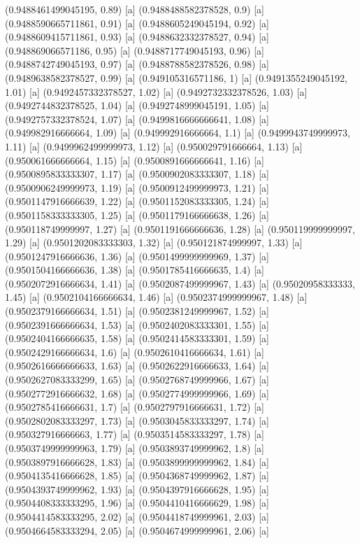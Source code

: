 {{{(0.9488461499045195, 0.89) [a] 
(0.9488488582378528, 0.9) [a] 
(0.9488590665711861, 0.91) [a] 
(0.9488605249045194, 0.92) [a] 
(0.9488609415711861, 0.93) [a] 
(0.9488632332378527, 0.94) [a] 
(0.948869066571186, 0.95) [a] 
(0.9488717749045193, 0.96) [a] 
(0.9488742749045193, 0.97) [a] 
(0.9488788582378526, 0.98) [a] 
(0.9489638582378527, 0.99) [a] 
(0.949105316571186, 1) [a] 
(0.9491355249045192, 1.01) [a] 
(0.9492457332378527, 1.02) [a] 
(0.9492732332378526, 1.03) [a] 
(0.9492744832378525, 1.04) [a] 
(0.9492748999045191, 1.05) [a] 
(0.9492757332378524, 1.07) [a] 
(0.9499816666666641, 1.08) [a] 
(0.949982916666664, 1.09) [a] 
(0.949992916666664, 1.1) [a] 
(0.9499943749999973, 1.11) [a] 
(0.9499962499999973, 1.12) [a] 
(0.950029791666664, 1.13) [a] 
(0.950061666666664, 1.15) [a] 
(0.9500891666666641, 1.16) [a] 
(0.9500895833333307, 1.17) [a] 
(0.9500902083333307, 1.18) [a] 
(0.9500906249999973, 1.19) [a] 
(0.9500912499999973, 1.21) [a] 
(0.9501147916666639, 1.22) [a] 
(0.9501152083333305, 1.24) [a] 
(0.9501158333333305, 1.25) [a] 
(0.9501179166666638, 1.26) [a] 
(0.950118749999997, 1.27) [a] 
(0.9501191666666636, 1.28) [a] 
(0.950119999999997, 1.29) [a] 
(0.9501202083333303, 1.32) [a] 
(0.950121874999997, 1.33) [a] 
(0.9501247916666636, 1.36) [a] 
(0.9501499999999969, 1.37) [a] 
(0.9501504166666636, 1.38) [a] 
(0.9501785416666635, 1.4) [a] 
(0.9502072916666634, 1.41) [a] 
(0.9502087499999967, 1.43) [a] 
(0.95020958333333, 1.45) [a] 
(0.9502104166666634, 1.46) [a] 
(0.9502374999999967, 1.48) [a] 
(0.9502379166666634, 1.51) [a] 
(0.9502381249999967, 1.52) [a] 
(0.9502391666666634, 1.53) [a] 
(0.9502402083333301, 1.55) [a] 
(0.9502404166666635, 1.58) [a] 
(0.9502414583333301, 1.59) [a] 
(0.9502429166666634, 1.6) [a] 
(0.9502610416666634, 1.61) [a] 
(0.9502616666666633, 1.63) [a] 
(0.9502622916666633, 1.64) [a] 
(0.9502627083333299, 1.65) [a] 
(0.9502768749999966, 1.67) [a] 
(0.9502772916666632, 1.68) [a] 
(0.9502774999999966, 1.69) [a] 
(0.9502785416666631, 1.7) [a] 
(0.9502797916666631, 1.72) [a] 
(0.9502802083333297, 1.73) [a] 
(0.9503045833333297, 1.74) [a] 
(0.950327916666663, 1.77) [a] 
(0.9503514583333297, 1.78) [a] 
(0.9503749999999963, 1.79) [a] 
(0.9503893749999962, 1.8) [a] 
(0.9503897916666628, 1.83) [a] 
(0.9503899999999962, 1.84) [a] 
(0.9504135416666628, 1.85) [a] 
(0.9504368749999962, 1.87) [a] 
(0.9504393749999962, 1.93) [a] 
(0.9504397916666628, 1.95) [a] 
(0.9504408333333295, 1.96) [a] 
(0.9504410416666629, 1.98) [a] 
(0.9504414583333295, 2.02) [a] 
(0.9504418749999961, 2.03) [a] 
(0.9504664583333294, 2.05) [a] 
(0.9504674999999961, 2.06) [a] 
}}}
